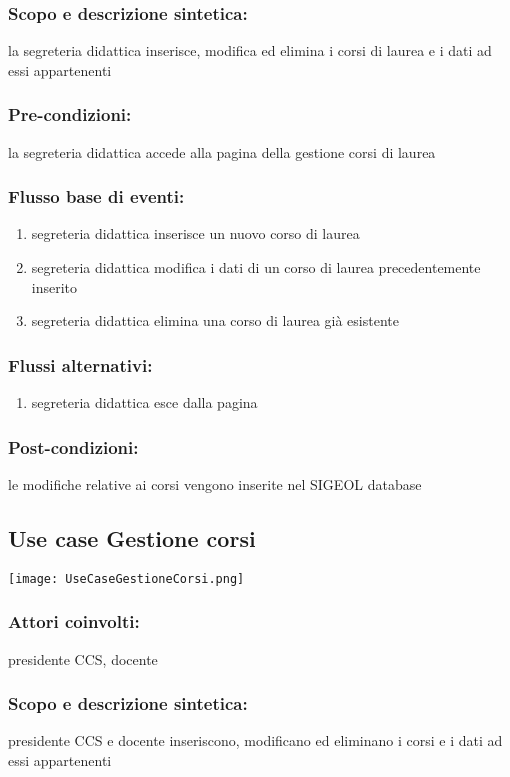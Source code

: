 \documentclass[11pt,a4paper]{article}
\begin{document}
\subsubsection*{Scopo e descrizione sintetica:}
la segreteria didattica inserisce, modifica ed elimina i corsi di laurea e i dati ad essi appartenenti
\subsubsection*{Pre-condizioni:}
la segreteria didattica accede alla pagina della gestione corsi di laurea
\subsubsection*{Flusso base di eventi:}
\begin{enumerate}
 \item segreteria didattica inserisce un nuovo corso di laurea
 \item segreteria didattica modifica i dati di un corso di laurea precedentemente inserito
 \item segreteria didattica elimina una corso di laurea già esistente
\end{enumerate}
\subsubsection*{Flussi alternativi:}
\begin{enumerate} 
\item segreteria didattica esce dalla pagina
\end{enumerate}
\subsubsection*{Post-condizioni:}
le modifiche relative ai corsi vengono inserite nel SIGEOL database

\subsection{Use case Gestione corsi}
\begin{center} 
 \texttt{[image: UseCaseGestioneCorsi.png]}
\end{center}
\subsubsection*{Attori coinvolti:}
presidente CCS, docente
\subsubsection*{Scopo e descrizione sintetica:}
presidente CCS e docente inseriscono, modificano ed eliminano i corsi e i dati ad essi appartenenti
\end{document}
